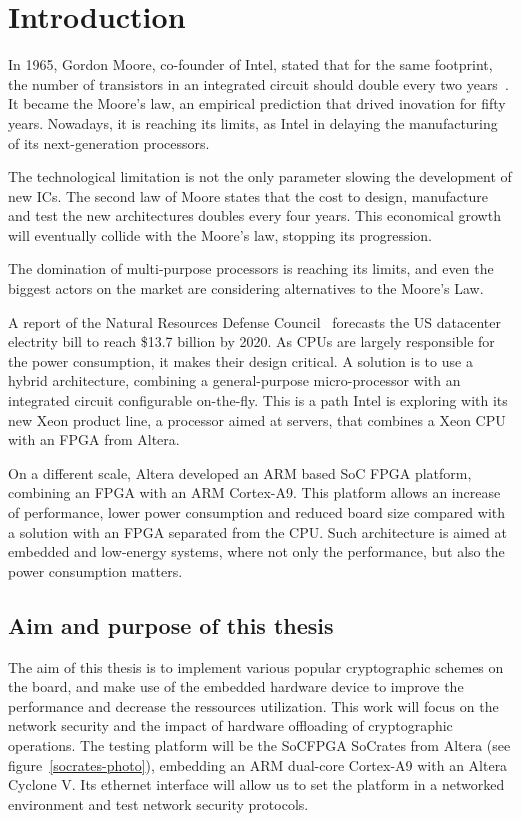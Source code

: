 \chapter{Introduction}
In 1965, Gordon Moore, co-founder of Intel, stated that for the same footprint, the number of transistors in an integrated circuit should double every two years~\cite{moore1965}.
It became the Moore's law, an empirical prediction that drived inovation for fifty years.
Nowadays, it is reaching its limits, as Intel in delaying the manufacturing of its next-generation processors.

The technological limitation is not the only parameter slowing the development of new ICs.
The second law of Moore states that the cost to design, manufacture and test the new architectures doubles every four years.
This economical growth will eventually collide with the Moore's law, stopping its progression.

The domination of multi-purpose processors is reaching its limits, and even the biggest actors on the market are considering alternatives to the Moore's Law.

\noindent A report of the Natural Resources Defense Council~\cite{nrdc2014} forecasts the US datacenter electrity bill to reach \$13.7 billion by 2020.
As CPUs are largely responsible for the power consumption, it makes their design critical.
A solution is to use a hybrid architecture, combining a general-purpose micro-processor with an integrated circuit configurable on-the-fly.
This is a path Intel is exploring with its new Xeon product line, a processor aimed at servers, that combines a Xeon CPU with an FPGA from Altera\cite{xeon2014}.\newline{}

On a different scale, Altera developed an ARM based SoC FPGA platform, combining an FPGA with an ARM Cortex-A9.
This platform allows an increase of performance, lower power consumption and reduced board size compared with a solution with an FPGA separated from the CPU.
Such architecture is aimed at embedded and low-energy systems, where not only the performance, but also the power consumption matters.







\section{Aim and purpose of this thesis}
The aim of this thesis is to implement various popular cryptographic schemes on the board, and make use of the embedded hardware device to improve the performance and decrease the ressources utilization.
This work will focus on the network security and the impact of hardware offloading of cryptographic operations.
The testing platform will be the SoCFPGA SoCrates from Altera (see figure~\ref{socrates-photo}), embedding an ARM dual-core Cortex-A9 with an Altera Cyclone V.
Its ethernet interface will allow us to set the platform in a networked environment and test network security protocols.


